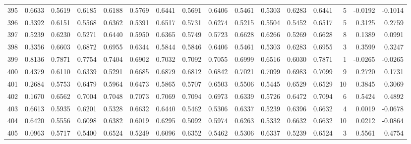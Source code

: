 \begin{tabular}{lrrrrrrrrrrrrrrr}
395 &      0.6633 &  0.5619 &  0.6185 &  0.6188 &  0.5769 &  0.6441 &  0.5691 &  0.6406 &  0.5461 &  0.5303 &   0.6283 &     0.6441 &      5 &                   -0.0192 &                    -0.1014 \\
396 &      0.3392 &  0.6151 &  0.5568 &  0.6362 &  0.5391 &  0.6517 &  0.5731 &  0.6274 &  0.5215 &  0.5504 &   0.5452 &     0.6517 &      5 &                    0.3125 &                     0.2759 \\
397 &      0.5239 &  0.6230 &  0.5271 &  0.6440 &  0.5950 &  0.6365 &  0.5749 &  0.5723 &  0.6628 &  0.6266 &   0.5269 &     0.6628 &      8 &                    0.1389 &                     0.0991 \\
398 &      0.3356 &  0.6603 &  0.6872 &  0.6955 &  0.6344 &  0.5844 &  0.5846 &  0.6406 &  0.5461 &  0.5303 &   0.6283 &     0.6955 &      3 &                    0.3599 &                     0.3247 \\
399 &      0.8136 &  0.7871 &  0.7754 &  0.7404 &  0.6902 &  0.7032 &  0.7092 &  0.7055 &  0.6999 &  0.6516 &   0.6030 &     0.7871 &      1 &                   -0.0265 &                    -0.0265 \\
400 &      0.4379 &  0.6110 &  0.6339 &  0.5291 &  0.6685 &  0.6879 &  0.6812 &  0.6842 &  0.7021 &  0.7099 &   0.6983 &     0.7099 &      9 &                    0.2720 &                     0.1731 \\
401 &      0.2684 &  0.5753 &  0.6479 &  0.5964 &  0.6473 &  0.5865 &  0.5707 &  0.6503 &  0.5506 &  0.5445 &   0.6529 &     0.6529 &     10 &                    0.3845 &                     0.3069 \\
402 &      0.1670 &  0.6562 &  0.7004 &  0.7048 &  0.7073 &  0.7069 &  0.7094 &  0.6973 &  0.6339 &  0.5726 &   0.6472 &     0.7094 &      6 &                    0.5424 &                     0.4892 \\
403 &      0.6613 &  0.5935 &  0.6201 &  0.5328 &  0.6632 &  0.6440 &  0.5462 &  0.5306 &  0.6337 &  0.5239 &   0.6396 &     0.6632 &      4 &                    0.0019 &                    -0.0678 \\
404 &      0.6420 &  0.5556 &  0.6098 &  0.6382 &  0.6019 &  0.6295 &  0.5092 &  0.5974 &  0.6263 &  0.5332 &   0.6632 &     0.6632 &     10 &                    0.0212 &                    -0.0864 \\
405 &      0.0963 &  0.5717 &  0.5400 &  0.6524 &  0.5249 &  0.6096 &  0.6352 &  0.5462 &  0.5306 &  0.6337 &   0.5239 &     0.6524 &      3 &                    0.5561 &                     0.4754 \\

\end{tabular}
